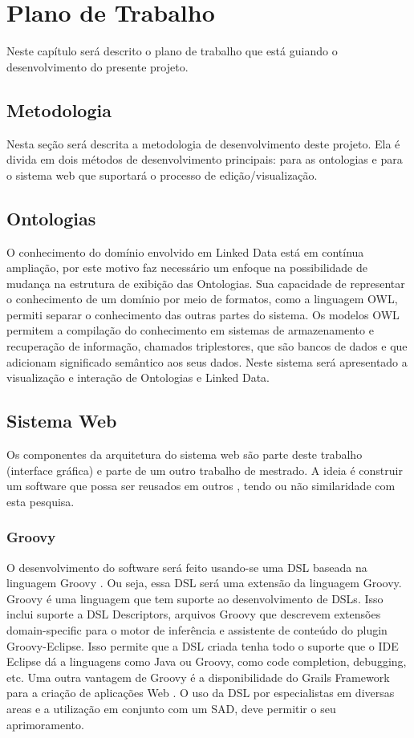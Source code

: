 \section{Plano de Trabalho}

Neste capítulo será descrito o plano de trabalho que está guiando o desenvolvimento do presente projeto.

\subsection{Metodologia}
\label{development_methodology}

Nesta seção será descrita a metodologia de desenvolvimento deste projeto. Ela é divida em dois métodos de desenvolvimento principais: para as ontologias e para o sistema web que suportará o processo de edição/visualização.

\subsection{Ontologias}

O conhecimento do domínio envolvido em Linked Data está em contínua ampliação, por este motivo faz necessário um enfoque na possibilidade de mudança na estrutura de exibição das Ontologias. Sua capacidade de representar o conhecimento de um domínio por meio de formatos, como a linguagem OWL, permiti separar o conhecimento das outras partes do sistema. Os modelos OWL permitem a compilação do conhecimento em sistemas de armazenamento e recuperação de informação, chamados triplestores, que são bancos de dados e que adicionam significado semântico aos seus dados. Neste sistema será apresentado a visualização e interação de Ontologias e Linked Data.

\subsection{Sistema Web}

Os componentes da arquitetura do sistema web são parte deste trabalho (interface gráfica) e parte de um outro trabalho de mestrado. A ideia é construir um software que possa ser reusados em outros , tendo ou não similaridade com esta pesquisa.

\subsubsection{Groovy}
O desenvolvimento do software será feito usando-se uma DSL baseada na linguagem Groovy \cite{Koenigetal2007}. Ou seja, essa DSL será uma extensão da linguagem Groovy. Groovy é uma linguagem que tem suporte ao desenvolvimento de DSLs. Isso inclui suporte a DSL Descriptors, arquivos Groovy que descrevem extensões domain-speciﬁc para o motor de inferência e assistente de conteúdo do plugin Groovy-Eclipse. Isso permite que a DSL criada tenha todo o suporte que o IDE Eclipse dá a linguagens como Java ou Groovy, como code completion, debugging, etc. Uma outra vantagem de Groovy é a disponibilidade do Grails Framework para a criação de aplicações Web \cite{Judd2008}. O uso da DSL por especialistas em diversas areas e a utilização em conjunto com um SAD, deve permitir o seu aprimoramento.

